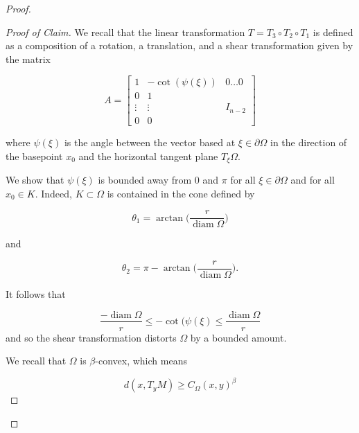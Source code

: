 \documentclass[letterpaper, 11pt, reqno]{amsart}
\DeclareMathOperator{\diamop}{diam}
\theoremstyle{definition}
\begin{document}
\begin{proof}
    \begin{proof}[Proof of Claim]
    We recall that the linear transformation $T= T_3 \circ T_2 \circ T_1$ is defined as a composition of a rotation, a translation, and a shear transformation given by the matrix

    \begin{equation}
A = \begin{bmatrix} 
1      & -\cot(\psi(\xi))      & 0\dots0 \\
0      & 1      &         \\
\vdots & \vdots & I_{n-2} \\
0      & 0      & 
\end{bmatrix}
\end{equation}
\vspace{0.1cm}

    where $\psi(\xi)$ is the angle between the vector based at $\xi \in \partial \Omega$ in the direction of the basepoint $x_0$ and the horizontal tangent plane $T_\xi \Omega$.

    We show that $\psi(\xi)$ is bounded away from 0 and $\pi$ for all $\xi \in \partial \Omega$ and for all $x_0 \in K$. Indeed, $K \subset \Omega$ is contained in the cone defined by 

    \begin{equation}
    \theta_1=\arctan \bigg(\frac{r}{\diamop \Omega}\bigg)   
    \end{equation}
    
 and 
 
    \begin{equation}
     \theta_2= \pi - \arctan \bigg(\frac{r}{\diamop \Omega}\bigg).   
    \end{equation}



    It follows that 
    
\begin{equation}
     \frac{-\diamop \Omega}{r} \leq -\cot(\psi(\xi) \leq \frac{\diamop \Omega}{r}   
\end{equation}
and so the shear transformation distorts $\Omega$ by a bounded amount.

    We recall that $\Omega$ is $\beta$-convex, which means

    \begin{equation}%
    d(x,T_yM) \geq C_\Omega(x,y)^\beta
\end{equation}


\end{proof}
\end{proof}
\end{document}
